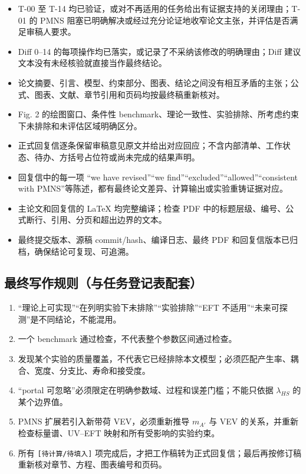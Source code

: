 \documentclass[
]{article}
\providecommand{\tightlist}{%
  \setlength{\itemsep}{0pt}\setlength{\parskip}{0pt}}
\begin{document}
\begin{itemize}
\tightlist
\item[$\square$]
  T-00 至 T-14
  均已验证，或对不再适用的任务给出有证据支持的关闭理由；T-01 的 PMNS
  阻塞已明确解决或经过充分论证地收窄论文主张，并评估是否满足审稿人要求。
\item[$\square$]
  Diff 0--14 的每项操作均已落实，或记录了不采纳该修改的明确理由；Diff
  建议文本没有未经核验就直接当作最终结论。
\item[$\square$]
  论文摘要、引言、模型、约束部分、图表、结论之间没有相互矛盾的主张；公式、图表、文献、章节引用和页码均按最终稿重新核对。
\item[$\square$]
  Fig. 2 的绘图窗口、条件性
  benchmark、理论一致性、实验排除、所考虑约束下未排除和未评估区域明确区分。
\item[$\square$]
  正式回复信逐条保留审稿意见原文并给出对应回应；不含内部清单、工作状态、待办、方括号占位符或尚未完成的结果声明。
\item[$\square$]
  回复信中的每一项 ``we have revised''``we
  find''``excluded''``allowed''``consistent with
  PMNS''等陈述，都有最终论文差异、计算输出或实验重铸证据对应。
\item[$\square$]
  主论文和回复信的 LaTeX 均完整编译；检查 PDF
  中的标题层级、编号、公式断行、引用、分页和超出边界的文本。
\item[$\square$]
  最终提交版本、源稿 commit/hash、编译日志、最终 PDF
  和回复信版本已归档，确保结论可复现、可追溯。
\end{itemize}

\subsection{最终写作规则（与任务登记表配套）}\label{ux6700ux7ec8ux5199ux4f5cux89c4ux5219ux4e0eux4efbux52a1ux767bux8bb0ux8868ux914dux5957}

\begin{enumerate}
\def\labelenumi{\arabic{enumi}.}
\tightlist
\item
  ``理论上可实现''``在列明实验下未排除''``实验排除''``EFT
  不适用''``未来可探测''是不同结论，不能混用。
\item
  一个 benchmark 通过检查，不代表整个参数区间通过检查。
\item
  发现某个实验的质量覆盖，不代表它已经排除本文模型；必须匹配产生率、耦合、宽度、分支比、寿命和接受度。
\item
  ``portal 可忽略''必须限定在明确参数域、过程和误差门槛；不能只依据
  \(\lambda_{HS}\) 的某个边界值。
\item
  PMNS 扩展若引入新带荷 VEV，必须重新推导 \(m_{A'}\) 与 VEV
  的关系，并重新检查标量谱、UV--EFT 映射和所有受影响的实验约束。
\item
  所有 \texttt{{[}待计算/\hspace{0pt}待填入{]}}
  项完成后，才把工作稿转为正式回复信；最后再按修订稿重新核对章节、方程、图表编号和页码。
\end{enumerate}
\end{document}
